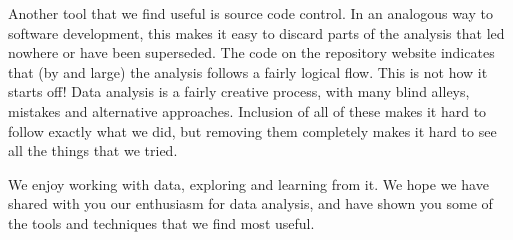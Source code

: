 \documentclass[oneside]{article}
\begin{document}
Another tool that we find useful is source code control.  In an analogous way to software development, this makes it easy to discard parts of the analysis that led nowhere or have been superseded.  The code on the repository website indicates that (by and large) the analysis follows a fairly logical flow.  This is not how it starts off!  Data analysis is a fairly creative process, with many blind alleys, mistakes and alternative approaches.  Inclusion of all of these makes it hard to follow exactly what we did, but removing them completely makes it hard to see all the things that we tried.  

We enjoy working with data, exploring and learning from it.  We hope we have shared with you our enthusiasm for data analysis, and have shown you some of the tools and techniques that we find most useful.  








\end{document}

